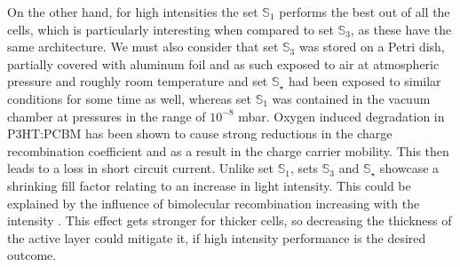 On the other hand, for high intensities the set $\mathbb{S}_1$ performs the best out of all the cells, which is particularly interesting when compared to set $\mathbb{S}_3$, as these have the same architecture. We must also consider that set $\mathbb{S}_3$ was stored on a Petri dish, partially covered with aluminum foil and as such exposed to air at atmospheric pressure and roughly room temperature and set $\mathbb{S}_\star$ had been exposed to similar conditions for some time as well, whereas set $\mathbb{S}_1$ was contained in the vacuum chamber at pressures in the range of $10^{-8}$ mbar. Oxygen induced degradation in P3HT:PCBM has been shown\cite{source14} to cause strong reductions in the charge recombination coefficient and as a result in the charge carrier mobility. This then leads to a loss in short circuit current.\mypar
Unlike set $\mathbb{S}_1$, sets $\mathbb{S}_3$ and $\mathbb{S}_\star$ showcase a shrinking fill factor relating to an increase in light intensity. This could be explained by the influence of bimolecular recombination increasing with the intensity \cite{source15}. This effect gets stronger for thicker cells, so decreasing the thickness of the active layer could mitigate it, if high intensity performance is the desired outcome.
